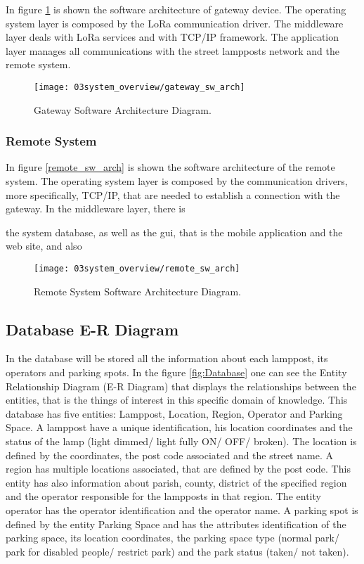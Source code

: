 In figure \ref{fig:gateway_sw_arch} is shown the software architecture of gateway device. The operating system layer is composed by the LoRa communication driver. The middleware layer deals with LoRa services and with TCP/IP framework. The application layer manages all communications with the street lampposts network and the remote system.

\begin{figure}[H]
	\centering
	\texttt{[image: 03system\_overview/gateway\_sw\_arch]}
	\caption{Gateway Software Architecture Diagram.}
	\label{fig:gateway_sw_arch}
\end{figure}

\subsubsection{Remote System}
In figure \ref{remote_sw_arch} is shown the software architecture of the remote system. The operating system layer is composed by the communication drivers, more specifically, TCP/IP, that are needed to establish a connection with the gateway. In the middleware layer, there is 

the system database, as well as the \ac{gui}, that is the mobile application and the web site, and also

\begin{figure}[H]
	\centering
	\texttt{[image: 03system\_overview/remote\_sw\_arch]}
	\caption{Remote System Software Architecture Diagram.}
	\label{fig:remote_sw_arch}
\end{figure}

\clearpage
\subsection{Database E-R Diagram}
In the database will be stored all the information about each lamppost, its operators and parking spots. In the figure \ref{fig:Database} one can see the Entity Relationship Diagram (E-R Diagram) that displays the relationships between the entities, that is the things of interest in this specific domain of knowledge. This database has five entities: Lamppost, Location, Region, Operator and Parking Space. A lamppost have a unique identification, his location coordinates and the status of the lamp (light dimmed/ light fully ON/ OFF/ broken). The location is defined by the coordinates, the post code associated and the street name. A region has multiple locations associated, that are defined by the post code. This entity has also information about parish, county, district of the specified region and the operator responsible for the lampposts in that region. The entity operator has the operator identification and the operator name. A parking spot is defined by the entity Parking Space and has the attributes identification of the parking space, its location coordinates, the parking space type (normal park/ park for disabled people/ restrict park) and the park status (taken/ not taken).

